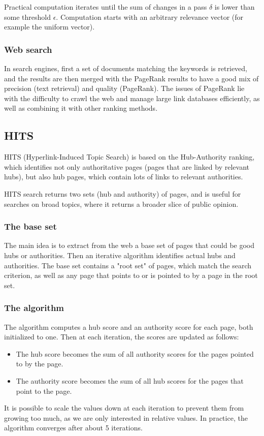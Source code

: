 Practical computation iterates until the sum of changes in a pass $\delta$ is lower than some threshold $\epsilon$. Computation starts with an arbitrary relevance vector (for example the uniform vector).

\subsubsection{Web search}

In search engines, first a set of documents matching the keywords is retrieved, and the results are then merged with the PageRank results to have a good mix of precision (text retrieval) and quality (PageRank).
The issues of PageRank lie with the difficulty to crawl the web and manage large link databases efficiently, as well as combining it with other ranking methods.

\subsection{HITS}

HITS (Hyperlink-Induced Topic Search) is based on the Hub-Authority ranking, which identifies not only authoritative pages (pages that are linked by relevant hubs), but also hub pages, which contain lots of links to relevant authorities.

HITS search returns two sets (hub and authority) of pages, and is useful for searches on broad topics, where it returns a broader slice of public opinion.

\subsubsection{The base set}

The main idea is to extract from the web a base set of pages that could be good hubs or authorities. Then an iterative algorithm identifies actual hubs and authorities.
The base set contains a "root set" of pages, which match the search criterion, as well as any page that points to or is pointed to by a page in the root set.

\subsubsection{The algorithm}

The algorithm computes a hub score and an authority score for each page, both initialized to one. Then at each iteration, the scores are updated as follows:
\begin{itemize}
\item The hub score becomes the sum of all authority scores for the pages pointed to by the page.
\item The authority score becomes the sum of all hub scores for the pages that point to the page.
\end{itemize}
It is possible to scale the values down at each iteration to prevent them from growing too much, as we are only interested in relative values.
In practice, the algorithm converges after about 5 iterations.

